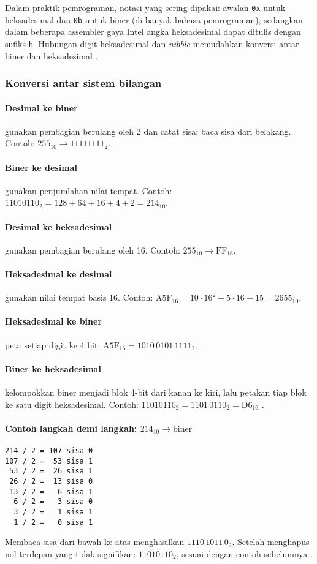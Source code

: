 Dalam praktik pemrograman, notasi yang sering dipakai: awalan \texttt{0x} untuk heksadesimal dan \texttt{0b} untuk biner (di banyak bahasa pemrograman), sedangkan dalam beberapa assembler gaya Intel angka heksadesimal dapat ditulis dengan sufiks \texttt{h}. Hubungan digit heksadesimal dan \textit{nibble} memudahkan konversi antar biner dan heksadesimal \cite{wiki_hexadecimal}.

\subsubsection{Konversi antar sistem bilangan}
\paragraph{Desimal ke biner} gunakan pembagian berulang oleh 2 dan catat sisa; baca sisa dari belakang. Contoh: \(255_{10} \to 11111111_2\).
\paragraph{Biner ke desimal} gunakan penjumlahan nilai tempat. Contoh: \(11010110_2 = 128+64+16+4+2 = 214_{10}\).
\paragraph{Desimal ke heksadesimal} gunakan pembagian berulang oleh 16. Contoh: \(255_{10} \to \mathrm{FF}_{16}\).
\paragraph{Heksadesimal ke desimal} gunakan nilai tempat basis 16. Contoh: \(\mathrm{A5F}_{16} = 10\cdot 16^2 + 5\cdot 16 + 15 = 2655_{10}\).
\paragraph{Heksadesimal ke biner} peta setiap digit ke 4 bit: \(\mathrm{A5F}_{16} = 1010\,0101\,1111_2\).

\paragraph{Biner ke heksadesimal} kelompokkan biner menjadi blok 4-bit dari kanan ke kiri, lalu petakan tiap blok ke satu digit heksadesimal. Contoh: \(11010110_2 = 1101\,0110_2 = \mathrm{D6}_{16}\) \cite{wiki_hexadecimal}.

\paragraph{Contoh langkah demi langkah: \(214_{10} \to \text{biner}\)}\mbox{}
\begin{verbatim}
214 / 2 = 107 sisa 0
107 / 2 =  53 sisa 1
 53 / 2 =  26 sisa 1
 26 / 2 =  13 sisa 0
 13 / 2 =   6 sisa 1
  6 / 2 =   3 sisa 0
  3 / 2 =   1 sisa 1
  1 / 2 =   0 sisa 1
\end{verbatim}
Membaca sisa dari bawah ke atas menghasilkan \(1110\,1011\,0_2\). Setelah menghapus nol terdepan yang tidak signifikan: \(11010110_2\), sesuai dengan contoh sebelumnya \cite{wiki_binary_number,wiki_positional_numeral_system}.


